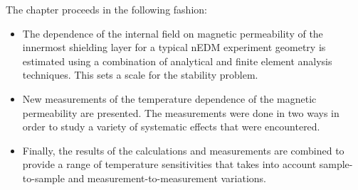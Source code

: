 





The chapter proceeds in the following fashion:
\begin{itemize}
\item The dependence of the internal field on magnetic permeability of
  the innermost shielding layer for a typical nEDM experiment geometry
  is estimated using a combination of analytical and finite element
  analysis techniques.  This sets a scale for the stability problem.
\item New measurements of the temperature dependence of the magnetic
  permeability are presented.  The measurements were done in two ways
  in order to study a variety of systematic effects that were
  encountered.
\item Finally, the results of the calculations and measurements are
  combined to provide a range of temperature sensitivities that takes
  into account sample-to-sample and measurement-to-measurement
  variations.
\end{itemize}



